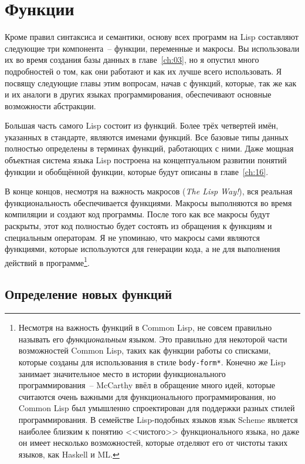 \chapter{Функции}
\label{ch:05}

Кроме правил синтаксиса и семантики, основу всех программ на Lisp составляют следующие три
компонента~-- функции, переменные и макросы.  Вы использовали их во время создания базы
данных в главе~\ref{ch:03}, но я опустил много подробностей о том, как они работают и как
их лучше всего использовать.  Я посвящу следующие главы этим вопросам, начав с функций,
которые, так же как и их аналоги в других языках программирования, обеспечивают основные
возможности абстракции.

Большая часть самого Lisp состоит из функций.  Более трёх четвертей имён, указанных в
стандарте, являются именами функций.  Все базовые типы данных полностью определены в
терминах функций, работающих с ними. Даже мощная объектная система языка Lisp построена на
концептуальном развитии понятий функции и обобщённой функции, которые будут описаны в
главе~\ref{ch:16}.

В конце концов, несмотря на важность макросов (\textit{The Lisp Way!}), вся реальная
функциональность обеспечивается функциями.  Макросы выполняются во время компиляции и
создают код программы. После того как все макросы будут раскрыты, этот код полностью будет
состоять из обращения к функциям и специальным операторам.  Я не упоминаю, что макросы
сами являются функциями, которые используются для генерации кода, а не для выполнения
действий в программе\footnote{Несмотря на важность функций в Common Lisp, не совсем
  правильно называть его \emph{функциональным} языком.  Это правильно для некоторой части
  возможностей Common Lisp, таких как функции работы со списками, которые созданы для
  использования в стиле \texttt{body-form*}.  Конечно же Lisp занимает значительное место
  в истории функционального программирования~-- McCarthy ввёл в обращение много идей,
  которые считаются очень важными для функционального программирования, но Common Lisp был
  умышленно спроектирован для поддержки разных стилей программирования.  В семействе
  Lisp-подобных языков язык Scheme является наиболее близким к понятию <<чистого>>
  функционального языка, но даже он имеет несколько возможностей, которые отделяют его от
  чистоты таких языков, как Haskell и ML.}.

\section{Определение новых функций}

